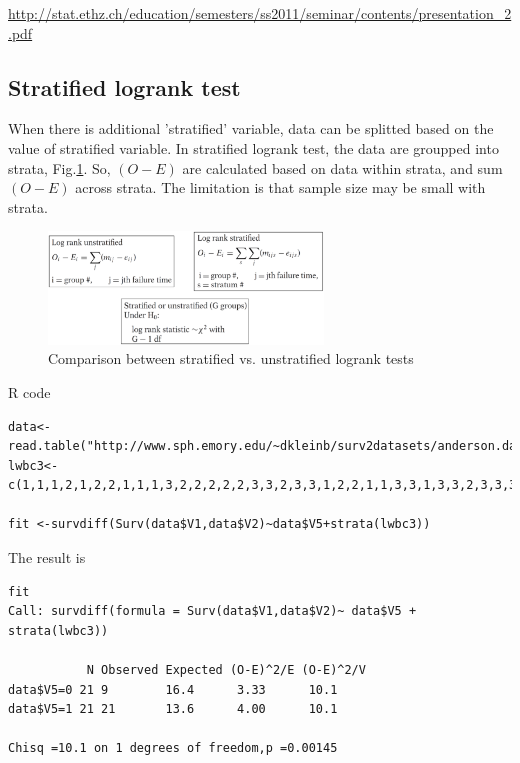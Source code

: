 \url{http://stat.ethz.ch/education/semesters/ss2011/seminar/contents/presentation_2.pdf}

\subsection{Stratified logrank test}

When there is additional 'stratified' variable, data can be splitted based on
the value of stratified variable. In stratified logrank test, the data are
groupped into strata, Fig.\ref{fig:logrank_stratified}. So, $(O-E)$ are
calculated based on data within strata, and sum $(O-E)$ across strata. The
limitation is that sample size may be small with strata.


\begin{figure}[hbt]
  \centerline{\includegraphics[height=3cm,
    angle=0]{./images/logrank_stratified.eps}}
  \caption{Comparison between stratified vs. unstratified logrank tests}
\label{fig:logrank_stratified}
\end{figure}


R code
\begin{verbatim}
data<-read.table("http://www.sph.emory.edu/~dkleinb/surv2datasets/anderson.dat")
lwbc3<-c(1,1,1,2,1,2,2,1,1,1,3,2,2,2,2,2,3,3,2,3,3,1,2,2,1,1,3,3,1,3,3,2,3,3,3,3,2,3,3,3,2,3)

fit <-survdiff(Surv(data$V1,data$V2)~data$V5+strata(lwbc3))
\end{verbatim}
The result is
\begin{verbatim}
fit 
Call: survdiff(formula = Surv(data$V1,data$V2)~ data$V5 + strata(lwbc3))

           N Observed Expected (O-E)^2/E (O-E)^2/V
data$V5=0 21 9        16.4      3.33      10.1
data$V5=1 21 21       13.6      4.00      10.1

Chisq =10.1 on 1 degrees of freedom,p =0.00145
\end{verbatim}

